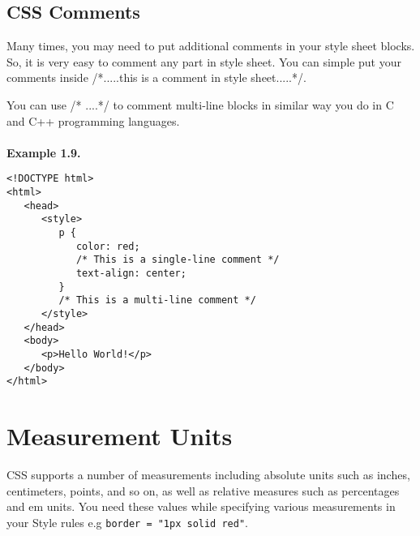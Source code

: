 \documentclass[a4paper,oneside]{book}
\numberwithin{equation}{chapter}
\begin{document}
\subsection{CSS Comments}
Many times, you may need to put additional comments in your style sheet blocks. So, it is very easy to comment any part in style sheet. You can simple put your comments inside /*.....this is a comment in style sheet.....*/.

You can use /* ....*/ to comment multi-line blocks in similar way you do in C and C++ programming languages.\\
\\
\textbf{Example 1.9.} 
\begin{verbatim}
<!DOCTYPE html>
<html>
   <head>
      <style>
         p {
            color: red;
            /* This is a single-line comment */
            text-align: center;
         }
         /* This is a multi-line comment */
      </style>
   </head>
   <body>
      <p>Hello World!</p>
   </body>
</html>
\end{verbatim}
\section{Measurement Units}
CSS supports a number of measurements including absolute units such as inches, centimeters, points, and so on, as well as relative measures such as percentages and em units. You need these values while specifying various measurements in your Style rules e.g \verb|border = "1px solid red"|.
\end{document}

